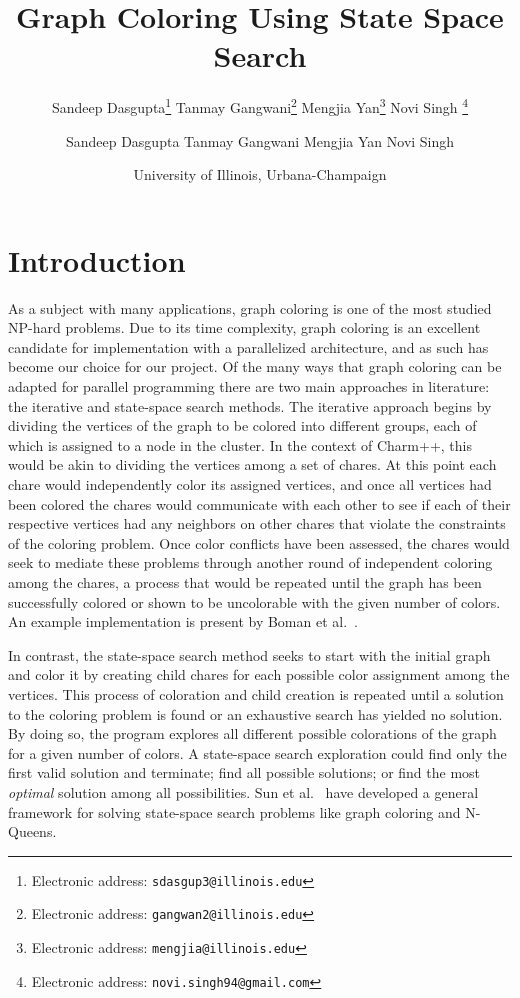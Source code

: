 \documentclass[10pt,oneside]{article}
\date{University of Illinois, Urbana-Champaign} %
\title{\textbf{Graph Coloring Using State Space Search}}
\author{Sandeep Dasgupta\thanks{Electronic address: \texttt{sdasgup3@illinois.edu}}
\qquad Tanmay Gangwani\thanks{Electronic address: \texttt{gangwan2@illinois.edu}}
\qquad Mengjia Yan\thanks{Electronic address: \texttt{mengjia@illinois.edu}}
\qquad  Novi Singh \thanks{Electronic address: \texttt{novi.singh94@gmail.com}}}
\author{Sandeep Dasgupta 
\qquad Tanmay Gangwani
\qquad Mengjia Yan
\qquad  Novi Singh}
\begin{document}
\thispagestyle{empty}

\maketitle
\section{Introduction}
As a subject with many applications, graph coloring is one of the most studied
  NP-hard problems. Due to its time complexity, graph coloring is an excellent
  candidate for implementation with a parallelized architecture, and as such
  has become our choice for our project. Of the many ways that graph coloring
  can be adapted for parallel programming there are two main approaches in
  literature: the iterative and state-space search methods.  The iterative
  approach begins by dividing the vertices of the graph to be colored into
  different groups, each of which is assigned to a node in the cluster. 
  In the context of Charm++, this would be akin to dividing the vertices
  among a set of chares. At this point each chare would independently color its
  assigned vertices, and once all vertices had been colored the chares would
  communicate with each other to see if each of their respective vertices had
  any neighbors on other chares that violate the constraints of the coloring
  problem. Once color conflicts have been assessed, the chares would seek to
  mediate these problems through another round of independent coloring among
  the chares, a process that would be repeated until the graph has been
  successfully colored or shown to be uncolorable with the given number of colors. 
  An example implementation is present by Boman et al.~\cite{EuroPar2005}.

  In contrast, the state-space search method seeks to start with the initial
  graph and color it by creating child chares for each possible color
  assignment among the vertices. This process of coloration and child creation
  is repeated until a solution to the coloring problem is found or an
  exhaustive search has yielded no solution. By doing so, the program explores
  all different possible colorations of the graph for a given number of colors. 
  A state-space search exploration could find only the first valid solution and terminate; 
  find all possible solutions; or find the most \emph{optimal} solution among all possibilities.
  Sun et al.~\cite{ParSSSEPPL} have developed a general framework for solving state-space search problems
  like graph coloring and N-Queens.
  
\end{document}
